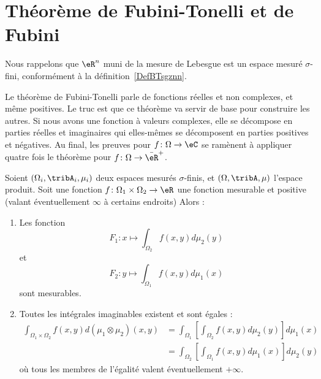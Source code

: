 \section{Théorème de Fubini-Tonelli et de Fubini}

Nous rappelons que \( \eR^n\) muni de la mesure de Lebesgue est un espace mesuré \( \sigma\)-fini, conformément à la définition~\ref{DefBTsgznn}.

Le théorème de Fubini-Tonelli parle de fonctions réelles et non complexes, et même positives. Le truc est que ce théorème va servir de base pour construire les autres. Si nous avons une fonction à valeurs complexes, elle se décompose en parties réelles et imaginaires qui elles-mêmes se décomposent en parties positives et négatives. Au final, les preuves pour \( f\colon \Omega\to \eC\) se ramènent à appliquer quatre fois le théorème pour \( f\colon \Omega\to \bar \eR^+\).
\begin{theorem}\label{ThoWTMSthY}
    Soient \( (\Omega_i,\tribA_i,\mu_i)\) deux espaces mesurés \( \sigma\)-finis, et \( (\Omega,\tribA,\mu)\) l'espace produit. Soit une fonction \( f\colon \Omega_1\times \Omega_2\to \eR\) une fonction mesurable et positive (valant éventuellement \( \infty\) à certains endroits)
    Alors :
    \begin{enumerate}
        \item       \label{ITEMooUTMNooVIBdpP}
            Les fonction
            \begin{equation}        \label{EQooWLADooQwNhEy}
                F_1\colon x\mapsto \int_{\Omega_2}f(x,y)d\mu_2(y)
            \end{equation}
            et
            \begin{equation}
                F_2\colon y\mapsto \int_{\Omega_1}f(x,y)d\mu_1(x)
            \end{equation}
            sont mesurables.
        \item   \label{ITEMooFKQUooCoCOLV}
            Toutes les intégrales imaginables existent et sont égales :
            \begin{subequations}    \label{EqJRVtOGx}
                \begin{align}
                    \int_{\Omega_1\times \Omega_2}f(x,y)d(\mu_1\otimes \mu_2)(x,y)&=\int_{\Omega_1}\left[ \int_{\Omega_2}f(x,y)d\mu_2(y) \right]d\mu_1(x)\\
                &=\int_{\Omega_2}\left[ \int_{\Omega_1}f(x,y)d\mu_1(x) \right]d\mu_2(y)
                \end{align}
            \end{subequations}
            où tous les membres de l'égalité valent éventuellement \( +\infty\).
    \end{enumerate}
\end{theorem}

